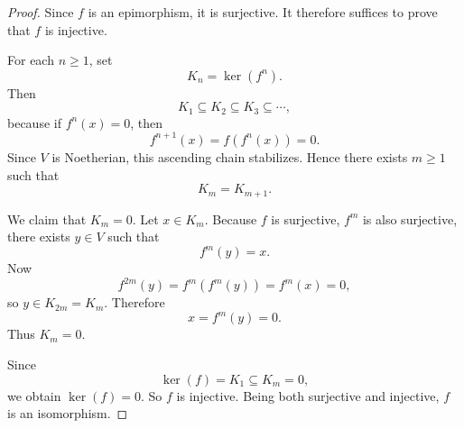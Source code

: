 \begin{proof}
    Since $f$ is an epimorphism, it is surjective.
    It therefore suffices to prove that $f$ is injective.

    For each $n\ge 1$, set
    \[
        K_n=\ker(f^n).
    \]
    Then
    \[
        K_1\subseteq K_2\subseteq K_3\subseteq \cdots,
    \]
    because if $f^n(x)=0$, then
    \[
        f^{n+1}(x)=f(f^n(x))=0.
    \]
    Since $V$ is Noetherian, this ascending chain stabilizes.
    Hence there exists $m\ge 1$ such that
    \[
        K_m=K_{m+1}.
    \]

    We claim that $K_m=0$.
    Let $x\in K_m$.
    Because $f$ is surjective, $f^m$ is also surjective, there exists $y\in V$ such that
    \[
        f^m(y)=x.
    \]
    Now
    \[
        f^{2m}(y)=f^m(f^m(y))=f^m(x)=0,
    \]
    so $y\in K_{2m}=K_m$.
    Therefore
    \[
        x=f^m(y)=0.
    \]
    Thus $K_m=0$.

    Since
    \[
        \ker(f)=K_1\subseteq K_m=0,
    \]
    we obtain $\ker(f)=0$.
    So $f$ is injective.
    Being both surjective and injective, $f$ is an isomorphism.
\end{proof}

